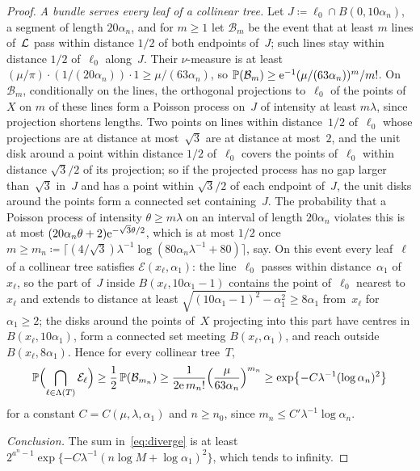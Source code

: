 \documentclass[11pt,letterpaper]{article}
\renewcommand{\cE}{\mathcal E}
\begin{document}
\begin{proof}
\emph{A bundle serves every leaf of a collinear tree.} Let $J\coloneqq\ell_0\cap B(0,10\alpha_n)$, a segment of length $20\alpha_n$, and for $m\ge1$ let $\mathcal B_m$ be the event that at least $m$ lines of~$\mathcal L$ pass within distance $1/2$ of both endpoints of~$J$; such lines stay within distance $1/2$ of~$\ell_0$ along~$J$. Their $\nu$-measure is at least $(\mu/\pi)\cdot(1/(20\alpha_n))\cdot1\ge\mu/(63\alpha_n)$, so $\mathbb P(\mathcal B_m)\ge\mathrm{e}^{-1}(\mu/(63\alpha_n))^m/m!$. On $\mathcal B_m$, conditionally on the lines, the orthogonal projections to~$\ell_0$ of the points of~$X$ on $m$ of these lines form a Poisson process on~$J$ of intensity at least $m\lambda$, since projection shortens lengths. Two points on lines within distance~$1/2$ of~$\ell_0$ whose projections are at distance at most~$\sqrt3$ are at distance at most~$2$, and the unit disk around a point within distance $1/2$ of~$\ell_0$ covers the points of~$\ell_0$ within distance $\sqrt3/2$ of its projection; so if the projected process has no gap larger than~$\sqrt3$ in~$J$ and has a point within $\sqrt3/2$ of each endpoint of~$J$, the unit disks around the points form a connected set containing~$J$. The probability that a Poisson process of intensity $\theta\ge m\lambda$ on an interval of length $20\alpha_n$ violates this is at most $(20\alpha_n\theta+2)\mathrm{e}^{-\sqrt3\theta/2}$, which is at most $1/2$ once $m\ge m_n\coloneqq\lceil(4/\sqrt3)\lambda^{-1}\log(80\alpha_n\lambda^{-1}+80)\rceil$, say. On this event every leaf~$\ell$ of a collinear tree satisfies $\cE(x_\ell,\alpha_1)$: the line~$\ell_0$ passes within distance~$\alpha_1$ of~$x_\ell$, so the part of~$J$ inside $B(x_\ell,10\alpha_1-1)$ contains the point of~$\ell_0$ nearest to~$x_\ell$ and extends to distance at least $\sqrt{(10\alpha_1-1)^2-\alpha_1^2}\ge8\alpha_1$ from~$x_\ell$ for $\alpha_1\ge2$; the disks around the points of~$X$ projecting into this part have centres in $B(x_\ell,10\alpha_1)$, form a connected set meeting $B(x_\ell,\alpha_1)$, and reach outside $B(x_\ell,8\alpha_1)$. Hence for every collinear tree~$T$,
\begin{equation*}
  \P\Bigl(\bigcap_{\ell\in\Lambda(T)}\cE_\ell\Bigr)\ge\frac12\,\P(\mathcal B_{m_n})\ge\frac{1}{2\e\,m_n!}\Bigl(\frac{\mu}{63\alpha_n}\Bigr)^{m_n}\ge\exp\bigl\{-C\lambda^{-1}(\log\alpha_n)^2\bigr\}
\end{equation*}
for a constant $C=C(\mu,\lambda,\alpha_1)$ and $n\ge n_0$, since $m_n\le C'\lambda^{-1}\log\alpha_n$.

\emph{Conclusion.} The sum in~\eqref{eq:diverge} is at least $2^{a^n-1}\exp\{-C\lambda^{-1}(n\log M+\log\alpha_1)^2\}$, which tends to infinity.
\end{proof}
\end{document}

